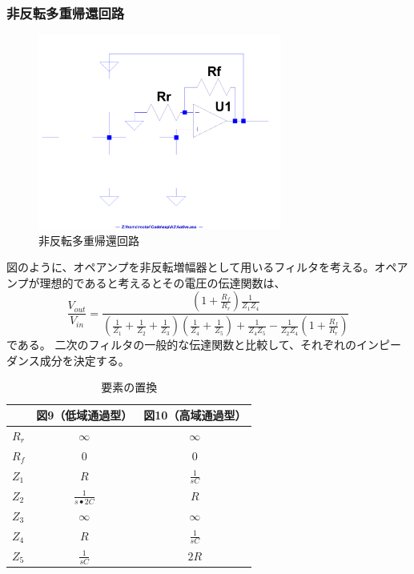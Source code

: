 \documentclass[10pt,a4j,dvipdfmx]{jsarticle}
\begin{document}
\subsubsection{非反転多重帰還回路}
\begin{figure}[H]
  \centering
  \includegraphics[width=8cm, angle=270]{Active.pdf}
  \caption{非反転多重帰還回路}
\end{figure}

図のように、オペアンプを非反転増幅器として用いるフィルタを考える。オペアンプが理想的であると考えるとその電圧の伝達関数は、
\begin{equation}
\frac{V_{out}}{V_{in}} = 
\frac{\left( 1+\frac{R_f}{R_r}\right) \frac{1}{Z_1 Z_4}}
{\left( \frac{1}{Z_1} + \frac{1}{Z_2} + \frac{1}{Z_3} \right) \left( \frac{1}{Z_4} + \frac{1}{Z_5} \right) + \frac{1}{Z_4 Z_5} - \frac{1}{Z_2 Z_4} \left( 1+\frac{R_f}{R_r} \right) }
\end{equation}
である。
二次のフィルタの一般的な伝達関数と比較して、それぞれのインピーダンス成分を決定する。
\begin{table}[htb]
  \begin{center}
    \caption{要素の置換}
    \begin{tabular}{|l||c|c|} \hline
       & 図9（低域通過型） & 図10（高域通過型）\\ \hline \hline
      $R_r$ & $\infty$ & $\infty$ \\
      $R_f$ & 0 & 0 \\
      $Z_1$ & $R$ & $\frac{1}{sC}$ \\
      $Z_2$ & $\frac{1}{s\bullet 2C}$ & $R$ \\
      $Z_3$ & $\infty$ & $\infty$ \\
      $Z_4$ & $R$ & $\frac{1}{s C}$ \\
      $Z_5$ & $\frac{1}{s C}$ & $2R$ \\ \hline
    \end{tabular}
  \end{center}
\end{table}
\end{document}
